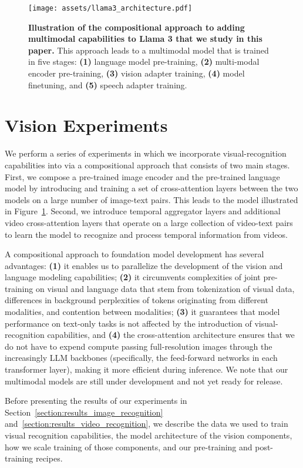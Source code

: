 \begin{figure}[t]
    \centering
    \texttt{[image: assets/llama3\_architecture.pdf]}
    \caption{\textbf{Illustration of the compositional approach to adding multimodal capabilities to Llama 3 that we study in this paper.} This approach leads to a multimodal model that is trained in five stages: \textbf{(1)} language model pre-training, \textbf{(2)} multi-modal encoder pre-training, \textbf{(3)} vision adapter training, \textbf{(4)} model finetuning, and \textbf{(5)} speech adapter training.}
    \label{sph:fig:multimodal_model_overview}
\end{figure}

\section{Vision Experiments}
\label{section:vision}

We perform a series of experiments in which we incorporate visual-recognition capabilities into \llamathree via a compositional approach that consists of two main stages.
First, we compose a pre-trained image encoder \citep{xu2023demystifying} and the pre-trained language model by introducing and training a set of cross-attention layers between the two models \citep{alayrac2022flamingo} on a large number of image-text pairs.
This leads to the model illustrated in Figure~\ref{sph:fig:multimodal_model_overview}.
Second, we introduce temporal aggregator layers and additional video cross-attention layers that operate on a large collection of video-text pairs to learn the model to recognize and process temporal information from videos.

A compositional approach to foundation model development has several advantages: \textbf{(1)} it enables us to parallelize the development of the vision and language modeling capabilities; \textbf{(2)} it circumvents complexities of joint pre-training on visual and language data that stem from tokenization of visual data, differences in background perplexities of tokens originating from different modalities, and contention between modalities; \textbf{(3)} it guarantees that model performance on text-only tasks is not affected by the introduction of visual-recognition capabilities, and \textbf{(4)} the cross-attention architecture ensures that we do not have to expend compute passing full-resolution images through the increasingly LLM backbones (specifically, the feed-forward networks in each transformer layer), making it more efficient during inference.
We note that our multimodal models are still under development and not yet ready for release.

Before presenting the results of our experiments in Section~\ref{section:results_image_recognition} and~\ref{section:results_video_recognition}, we describe the data we used to train visual recognition capabilities, the model architecture of the vision components, how we scale training of those components, and our pre-training and post-training recipes.








